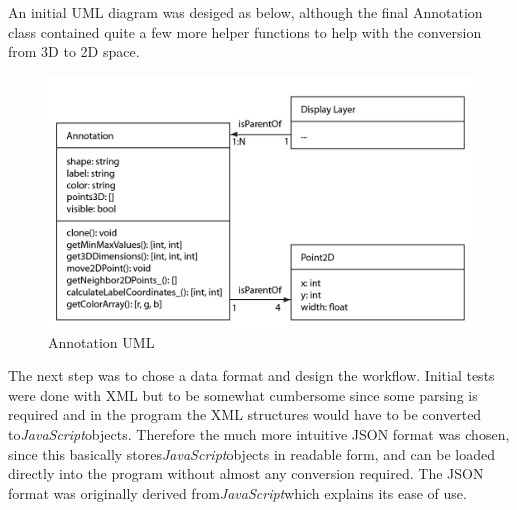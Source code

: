 \documentclass[a4paper,11pt,twoside]{article}
\begin{document}
An initial UML diagram was desiged as below, although the final Annotation class contained quite a few more helper functions to help with the conversion from 3D to 2D space.

\begin{figure}[ht!]
\centering
\includegraphics[width=140mm]{graphics/annoUML_01.png}
\caption{Annotation UML}
\label{fig:UIdesign1}
\end{figure}





The next step was to chose a data format and design the workflow. Initial tests were done with XML but to be somewhat cumbersome since some parsing is required and in the program the XML structures would have to be converted to\textit{JavaScript}objects. Therefore the much more intuitive JSON format was chosen, since this basically stores\textit{JavaScript}objects in readable form, and can be loaded directly into the program without almost any conversion required. The JSON format was originally derived from\textit{JavaScript}which explains its ease of use.
\end{document}
